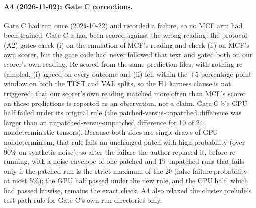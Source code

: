 \paragraph{A4 (2026-11-02): Gate C corrections.} Gate C had run once
(2026-10-22) and recorded a failure, so no MCF arm had been trained. Gate C-a
had been scored against the wrong reading: the protocol (A2) gates check (i) on the
emulation of MCF's reading and check (ii) on MCF's own scorer, but the gate code had
never followed that text and gated both on our scorer's own reading. Re-scored from
the same prediction files, with nothing re-sampled, (i) agreed on every outcome and
(ii) fell within the $\pm5$ percentage-point window on both the TEST and VAL splits,
so the H1 harness clause is not triggered; that our scorer's own reading matched
more often than MCF's scorer on these predictions is reported as an observation,
not a claim. Gate C-b's GPU half failed under its original rule (the
patched-versus-unpatched difference was larger than an unpatched-versus-unpatched
difference for 10 of 24 nondeterministic tensors). Because both sides are single
draws of GPU nondeterminism, that rule fails an unchanged patch with high
probability (over 90\% on synthetic noise), so after the failure the author
replaced it, before re-running, with a noise envelope of one patched and 19
unpatched runs that fails only if the patched run is the strict maximum of the 20
(false-failure probability at most 5\%); the GPU half passed under the new rule,
and the CPU half, which had passed bitwise, remains the exact check. A4 also
relaxed the cluster prelude's test-path rule for Gate C's own run directories only.

